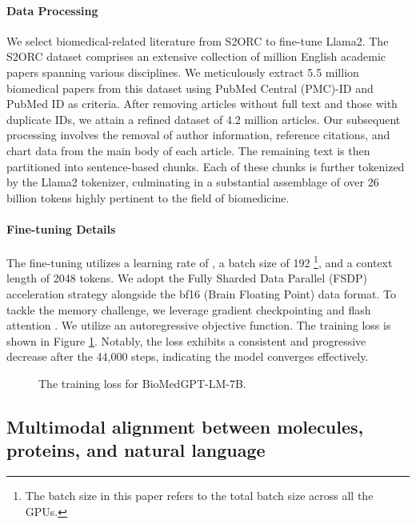 \documentclass{article}
\begin{document}
\paragraph{Data Processing}
We select biomedical-related literature from S2ORC to fine-tune Llama2. The S2ORC dataset comprises an extensive collection of  million English academic papers spanning various disciplines. We meticulously extract 5.5 million biomedical papers from this dataset using PubMed Central (PMC)-ID and PubMed ID as criteria. After removing articles without full text and those with duplicate IDs, we attain a refined dataset of 4.2 million articles. Our subsequent processing involves the removal of author information, reference citations, and chart data from the main body of each article. The remaining text is then partitioned into sentence-based chunks. Each of these chunks is further tokenized by the Llama2 tokenizer, culminating in a substantial assemblage of over 26 billion tokens highly pertinent to the field of biomedicine.

\paragraph{Fine-tuning Details}
 The fine-tuning utilizes a learning rate of , a batch size of 192 \footnote{The batch size in this paper refers to the total batch size across all the GPUs.}, and a context length of 2048 tokens. We adopt the Fully Sharded Data Parallel (FSDP) acceleration strategy alongside the bf16 (Brain Floating Point) data format. To tackle the memory challenge, we leverage gradient checkpointing \citep{chen2016training} and flash attention \citep{dao2022flashattention}. We utilize an autoregressive objective function. The training loss is shown in Figure \ref{loss_figure}. Notably, the loss exhibits a consistent and progressive decrease after the 44,000 steps, indicating the model converges effectively.

\begin{figure}[htpb]
  \centering
  \vspace{-0.4cm}
  \caption{The training loss for BioMedGPT-LM-7B.}
  \label{loss_figure}
\end{figure}



\subsection{Multimodal alignment between molecules, proteins, and natural language} 
\end{document}
